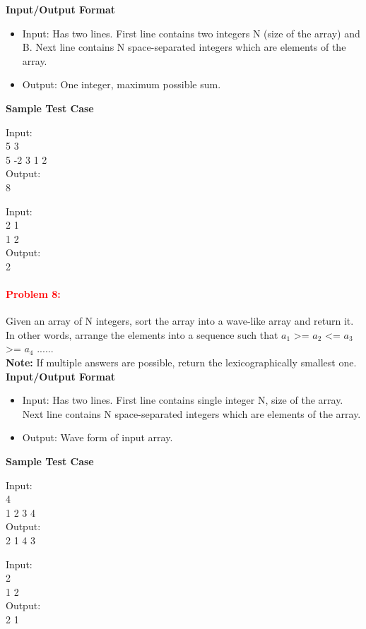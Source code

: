 \documentclass[a4paper,11pt]{article} %
\begin{document}
\textbf{Input/Output Format}
\begin{itemize}
    \item  Input: Has two lines. First line contains two integers N (size of the array) and B. Next line contains N space-separated integers which are elements of the array.
    \item  Output: One integer, maximum possible sum.
\end{itemize}

\textbf{Sample Test Case}

Input:\\
5 3\\
5 -2 3 1 2 \\
Output: \\
8
\vspace*{0.5cm}

Input: \\
2 1\\
1 2 \\
Output: \\
2
\vspace*{0.5cm}

\paragraph{\textcolor{red}{Problem 8:}}
Given an array of N integers, sort the array into a wave-like array and return it. In other words, arrange the elements into a sequence such that $a_1$ >= $a_2$ <= $a_3$ >= $a_4$ ......\\
\textbf{Note:} If multiple answers are possible, return the lexicographically smallest one.\\
\textbf{Input/Output Format}
\begin{itemize}
    \item  Input: Has two lines. First line contains single integer N, size of the array. Next line contains N space-separated integers which are elements of the array.
    \item  Output: Wave form of input array.
\end{itemize}

\textbf{Sample Test Case}

Input:\\
4\\
1 2 3 4 \\
Output:\\
2 1 4 3
\vspace*{0.5cm}

Input:\\
2\\
1 2\\
Output:\\
2 1
\vspace*{0.5cm}
\end{document}
